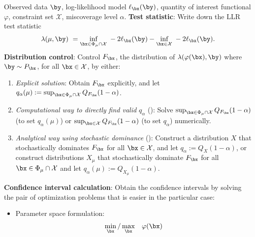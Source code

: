 \documentclass[11pt]{article}
\numberwithin{equation}{section}
\numberwithin{figure}{section}
\begin{document}
\begin{algorithm}[!ht]
\caption{Meta-algorithm for confidence interval construction}
\label{alg:metaalgo}
\begin{algorithmic}[1]
\REQUIRE Observed data $\by$, log-likelihood model $\ell_\bx(\by)$, quantity of interest functional $\varphi$, constraint set $\mathcal X$, miscoverage level $\alpha$.
\vspace{0.5em}
\STATE \textbf{Test statistic}: Write down the LLR test statistic
\begin{equation}
\lambda(\mu, \by) ~= \underset{\bx \in \Phi_\mu \cap \mathcal{X}}{\text{inf}} \; -2\ell_{\bx}(\by)- \underset{\bx \in \mathcal{X}}{\text{inf}} \; -2 \ell_{\bx}(\by).
\end{equation}
\STATE \textbf{Distribution control}: Control $F_{\bx}$, the distribution of $\lambda(\varphi(\bx), \by)$ where $\by \sim P_{\bx}$, for all $\bx \in \mathcal X$, by either:
\begin{enumerate}[leftmargin=7mm,label=\Alph*.]
    \itemsep0em 
    \item \emph{Explicit solution}: 
    Obtain $F_\bx$ explicitly, and let $q_\alpha(\mu) := \sup_{\bx \in \Phi_\mu \cap \mathcal{X}} Q_{F_\bx}(1-\alpha)$.
    \item \emph{Computational way to directly find valid $q_\alpha$} (): Solve $\sup_{\bx \in \Phi_\mu \cap \mathcal{X}} Q_{F_\bx}(1-\alpha)$ (to set $q_\alpha(\mu)$) or $\sup_{\bx \in \mathcal{X}} Q_{F_\bx}(1-\alpha)$ (to set $q_\alpha$) numerically.
    \item \emph{Analytical way using stochastic dominance} (): 
    Construct a distribution $X$ that stochastically dominates $F_{\bx}$ for all $\bx \in \mathcal X$, and let $q_\alpha := Q_X(1-\alpha)$, or construct distributions $X_\mu$ that stochastically dominate $F_{\bx}$ for all $\bx \in \Phi_\mu \cap \mathcal{X}$ and let $q_\alpha(\mu) := Q_{X_\mu}(1-\alpha)$.
\end{enumerate}
\STATE \textbf{Confidence interval calculation}: Obtain the confidence intervals by solving the pair of optimization problems that is easier in the particular case:
\begin{itemize}[leftmargin=7mm]
    \item[I.]
    Parameter space formulation:
            \begin{equation}\label{optA}
            \begin{aligned}
            \min_{\bx}/\max_{\bx} \quad & \varphi(\bx) \\

\end{aligned}
\end{equation}
\end{itemize}
\end{algorithmic}
\end{algorithm}
\end{document}
